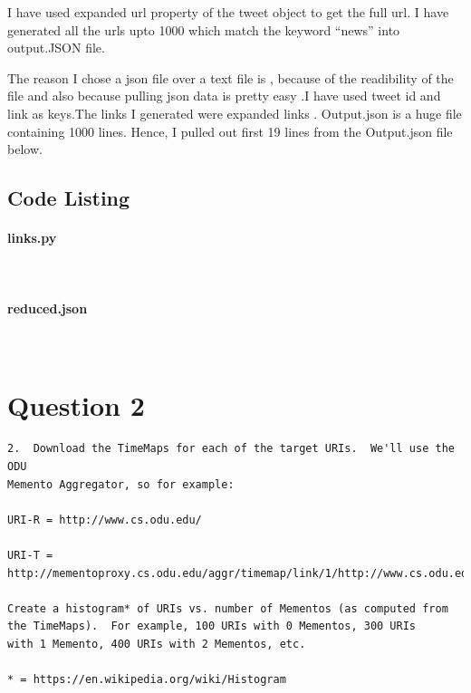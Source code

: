 \documentclass[letterpaper,11pt]{article}
\begin{document}
I have used expanded url property of the tweet object to get the full url. I have generated all the urls upto 1000 which match the keyword ``news'' into output.JSON file. 

The reason I chose a json file over a text file is , because of the readibility of the file and also because pulling json data is pretty easy .I have used tweet id  and link as keys.The links I generated were expanded links . Output.json is a huge file containing 1000 lines. Hence, I pulled out first 19 lines from the Output.json file below.

 
 

\subsection{Code Listing}
\paragraph{links.py}\mbox{} \\


\newpage

\paragraph{reduced.json}\mbox{} \\


\newpage


\section{Question 2}
\label{part2}
\begin{verbatim}
2.  Download the TimeMaps for each of the target URIs.  We'll use the ODU 
Memento Aggregator, so for example:

URI-R = http://www.cs.odu.edu/

URI-T = http://mementoproxy.cs.odu.edu/aggr/timemap/link/1/http://www.cs.odu.edu/

Create a histogram* of URIs vs. number of Mementos (as computed from
the TimeMaps).  For example, 100 URIs with 0 Mementos, 300 URIs
with 1 Memento, 400 URIs with 2 Mementos, etc.

* = https://en.wikipedia.org/wiki/Histogram
\end{verbatim}
\end{document}
